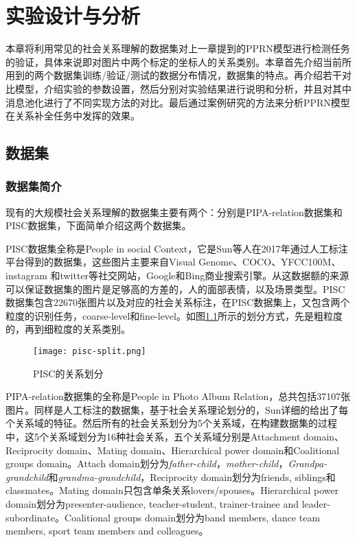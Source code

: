 
\chapter{实验设计与分析}
\label{ch:exp}

本章将利用常见的社会关系理解的数据集对上一章提到的PPRN模型进行检测任务的验证，具体来说即对图片中两个标定的坐标人的关系类别。本章首先介绍当前所用到的两个数据集训练/验证/测试的数据分布情况，数据集的特点。再介绍若干对比模型，介绍实验的参数设置，然后分别对实验结果进行说明和分析，并且对其中消息池化进行了不同实现方法的对比。最后通过案例研究的方法来分析PPRN模型在关系补全任务中发挥的效果。

\section{数据集}

\subsection{数据集简介}

现有的大规模社会关系理解的数据集主要有两个：分别是PIPA-relation\cite{sun2017a}数据集和PISC\cite{li2017dual-glance}数据集，下面简单介绍这两个数据集。

PISC数据集全称是People in social Context，它是Sun等人在2017年通过人工标注平台得到的数据集，这些图片主要来自Visual Genome\cite{krishna2017visual}、COCO\cite{lin2014microsoft}、YFCC100M\cite{thomee2016yfcc100m}、instagram 和twitter等社交网站，Google和Bing商业搜索引擎。从这数据额的来源可以保证数据集的图片是足够高的方差的，人的面部表情，以及场景类型。PISC数据集包含22670张图片以及对应的社会关系标注，在PISC数据集上，又包含两个粒度的识别任务，coarse-level和fine-level。如图\ref{fig:exp-pisc-r}所示的划分方式，先是粗粒度的，再到细粒度的关系类别。
\begin{figure}[htpb]
	\centering
	\texttt{[image: pisc-split.png]}
    \caption{PISC的关系划分}
	\vspace*{-3.5mm}
	\label{fig:exp-pisc-r}
\end{figure}

PIPA-relation数据集的全称是People in Photo Album Relation，总共包括37107张图片。同样是人工标注的数据集，基于社会关系理论\cite{bugental2000acquisition}划分的，Sun\cite{sun2017a}详细的给出了每个关系域的特征。然后所有的社会关系划分为5个关系域，在构建数据集的过程中，这5个关系域划分为16种社会关系，五个关系域分别是Attachment domain、Reciprocity domain、Mating domain、Hierarchical power domain和Coalitional groups domain。Attach domain划分为{\it father-child}，{\it mother-child}，{\it Grandpa-grandchild}和{\it grandma-grandchild}，Reciprocity domain划分为friends, siblings和classmates。Mating domain只包含单条关系lovers/spouses。Hierarchical power domain划分为presenter-audience, teacher-student, trainer-trainee and leader-subordinate。Coalitional groups domain划分为band members, dance team members, sport team members and colleagues。


